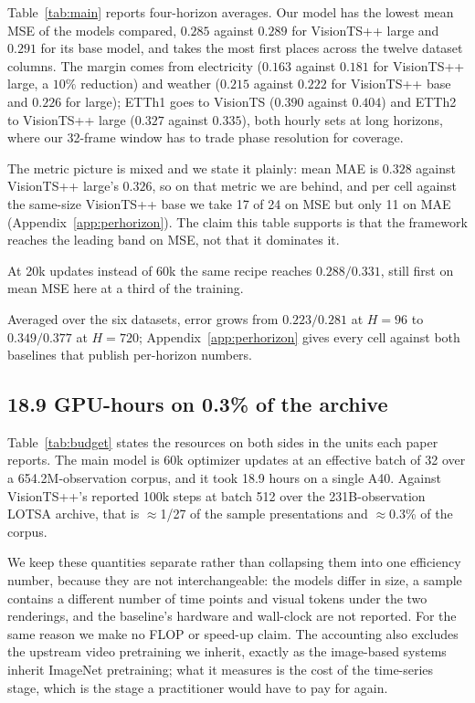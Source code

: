 

Table~\ref{tab:main} reports four-horizon averages. Our model has the lowest mean MSE of the models
compared, $0.285$ against $0.289$ for VisionTS++ large and $0.291$ for its base model, and takes the
most first places across the twelve dataset columns. The margin comes from electricity ($0.163$ against
$0.181$ for VisionTS++ large, a $10\%$ reduction) and weather ($0.215$ against $0.222$ for
VisionTS++ base and $0.226$ for large); ETTh1 goes to VisionTS
($0.390$ against $0.404$) and ETTh2 to VisionTS++ large ($0.327$ against $0.335$), both hourly sets
at long horizons, where our 32-frame window has to trade phase resolution for coverage.

The metric picture is mixed and we state it plainly: mean MAE is $0.328$ against VisionTS++ large's
$0.326$, so on that metric we are behind, and per cell against the same-size VisionTS++ base we take
17 of 24 on MSE but only 11 on MAE (Appendix~\ref{app:perhorizon}). The claim this table supports is
that the framework reaches the leading band on MSE, not that it dominates it.

At 20k updates instead of 60k the same recipe reaches $0.288/0.331$, still first on mean MSE here at
a third of the training.


Averaged over the six datasets, error grows from $0.223/0.281$ at $H{=}96$ to $0.349/0.377$ at
$H{=}720$; Appendix~\ref{app:perhorizon} gives every cell against both baselines that publish
per-horizon numbers.

\subsection{18.9 GPU-hours on 0.3\% of the archive}
\label{sec:budget}



Table~\ref{tab:budget} states the resources on both sides in the units each paper reports. The main
model is 60k optimizer updates at an effective batch of 32 over a 654.2M-observation corpus, and it
took 18.9 hours on a single A40. Against VisionTS++'s reported 100k steps at batch 512 over the
231B-observation LOTSA archive, that is $\approx$1/27 of the sample presentations and $\approx$0.3\%
of the corpus.

We keep these quantities separate rather than collapsing them into one efficiency number, because
they are not interchangeable: the models differ in size, a sample contains a different number of
time points and visual tokens under the two renderings, and the baseline's hardware and wall-clock
are not reported. For the same reason we make no FLOP or speed-up claim. The accounting also
excludes the upstream video pretraining we inherit, exactly as the image-based systems inherit
ImageNet pretraining; what it measures is the cost of the time-series stage, which is the stage a
practitioner would have to pay for again.

